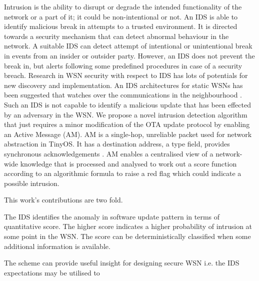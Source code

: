 \documentclass[conference,final]{IEEEtran}
\newcommand{\dme}[2]{\pdfmarkupcomment[markup=Highlight,color=yellow]{#1}{#2}}
\begin{document}



Intrusion is the ability to disrupt or degrade the intended functionality of the network or a part of it; it could be non-intentional or not.
An IDS is able to identify malicious break in attempts  to a trusted environment.
It is directed towards a security mechanism that can detect abnormal behaviour in the network.
A suitable IDS can detect attempt of intentional or unintentional break in events from an insider or outsider party.
However, an IDS does not prevent the break in, but alerts following some predefined procedures in case of a security breach.
Research in WSN security with respect to IDS has lots of potentials for new discovery and implementation.
An IDS architectures for static WSNs has been suggested that watches over the communications in the neighbourhood \cite{roman2006applying}.
Such an IDS is not capable to identify a malicious update that has been effected by an adversary in the WSN.
We propose a novel intrusion detection algorithm that just requires a minor modification of the OTA update protocol by enabling an Active Message (AM). AM is  a single-hop, unreliable packet used for network abstraction in TinyOS. It has a destination address, a type field, provides synchronous acknowledgements \cite{tep116}.
AM enables a centralised view of a network-wide knowledge  that is processed and analysed to work out a score function according to an algorithmic formula to raise a red flag which could indicate a possible intrusion.



This work's contributions are two fold.
\begin{inparaenum}
\item The IDS identifies the anomaly in software update pattern in terms of quantitative score. The higher score indicates a higher probability of intrusion at some point in the WSN. The score can be deterministically classified when some additional information is available.
\item The scheme can provide useful insight for designing secure WSN i.e. the IDS expectations may be utilised to 
\end{inparaenum}
\end{document}
